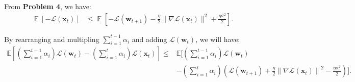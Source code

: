 \documentclass[letterpaper]{article}
\newcommand{\E}{\mathop{\mathbb{E}}}
\renewcommand{\L}{\mathcal{L}}
\newcommand{\bx}{\mathbf{x}}
\newcommand{\bw}{\mathbf{w}}
\begin{document}
\begin{enumerate}
%
%
From \textbf{Problem 4}, we have:
\begin{equation}
	\begin{aligned}
		\E\left[ - \L(\bx_t)\right]&\le \E\left[-\L(\bw_{t+1})- \frac{\eta}{2}\| \nabla \L(\bx_t)\|^2 + \frac{\eta \sigma^2 }{2}\right].
	\end{aligned}
\end{equation}

By rearranging and multipling $\sum_{i=1}^{t-1} \alpha_i$ and adding $\mathcal{L}\left(\mathbf{w}_t\right)$, we will have:
\begin{equation}
	\begin{aligned}
		\mathbb{E}\left[\left(\sum_{i=1}^{t-1} \alpha_i\right) \mathcal{L}\left(\mathbf{w}_t\right)-\left(\sum_{i=1}^t \alpha_i\right) \mathcal{L}\left(\mathbf{x}_t\right)\right] \leq & \mathbb{E}[\left(\sum_{i=1}^{t-1} \alpha_i\right) \mathcal{L}\left(\mathbf{w}_t\right)\\
		&-\left(\sum_{i=1}^t \alpha_i\right)\left(\mathcal{L}\left(\mathbf{w}_{t+1}\right)+\frac{\eta}{2}\left\|\nabla \mathcal{L}\left(\mathbf{x}_t\right)\right\|^2-\frac{\eta \sigma^2}{2}\right)].
	\end{aligned}
\end{equation}


\end{enumerate}
\end{document}
